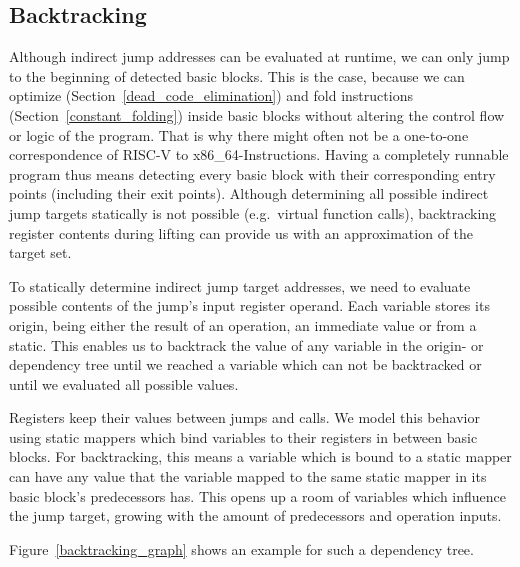 \documentclass[course=eragp]{aspdoc}
\begin{document}
\subsection{Backtracking}\label{backtracking}
Although indirect jump addresses can be evaluated at runtime, we can only jump to the beginning of
detected basic blocks. This is the case, because we can optimize (Section~\ref{dead_code_elimination}) and fold
instructions (Section~\ref{constant_folding}) inside basic blocks without altering the control flow or
logic of the program. That is why there might often not be a one-to-one correspondence of RISC-V to x86\_64-Instructions.
Having a completely runnable program thus means detecting every basic block
with their corresponding entry points (including their exit points). Although determining all possible
indirect jump targets statically is not possible (e.g.\ virtual function calls),
backtracking register contents during lifting can provide us with
an approximation of the target set.

\par

To statically determine indirect jump target addresses, we need to evaluate possible contents of
the jump's input register operand. Each variable stores its origin, being either the result of an
operation, an immediate value or from a static. This enables us to backtrack the value of
any variable in the origin- or dependency tree until we reached a variable which can not be backtracked or until we evaluated
all possible values.

\par

Registers keep their values between jumps and calls. We model this behavior using static mappers
which bind variables to their registers in between basic blocks. For backtracking, this means a
variable which is bound to a static mapper can have any value that the variable mapped to the same
static mapper in its basic block's predecessors has. This opens up a room of variables which
influence the jump target, growing with the amount of predecessors and operation inputs.

\par

Figure~\ref{backtracking_graph} shows an example for such a dependency tree.
\end{document}
